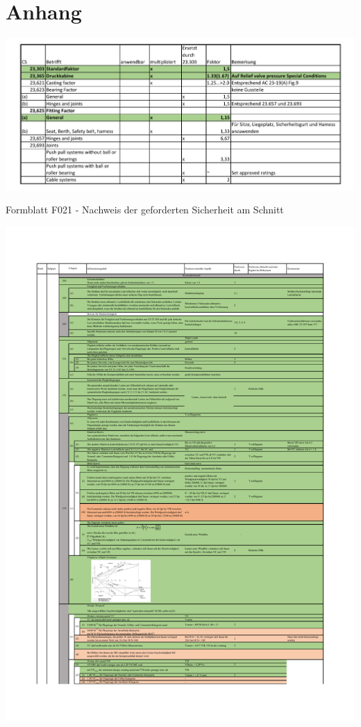 \chapter{Anhang}

\begin{table}[H]
\centering
\includegraphics[width=1.0\textwidth, trim={5mm 5mm 5mm 5mm}, clip]{bilder/Tabellen/Sicherheitsfaktoren.pdf}
\caption{Formblatt F021 - Nachweis der geforderten Sicherheit am Schnitt} 
\label{tab:Sicherheiten}
\end{table}

\clearpage

\begin{table}[H]
\centering
\includegraphics[width=1.0\textwidth, trim={19mm 19mm 19mm 19mm}, clip]{bilder/Tabellen/MPP_Konstruktion_1.pdf}
\end{table}

